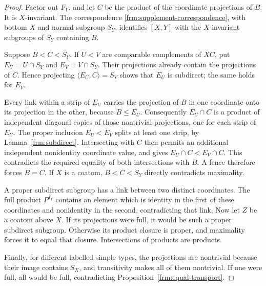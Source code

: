 \begin{proof}
Factor out $F_Y$, and let $C$ be the product of the coordinate
projections of $B$. It is $X$-invariant. The correspondence
\eqref{frm:supplement-correspondence}, with bottom $X$ and normal
subgroup $S_Y$, identifies $[X,Y]$ with the $X$-invariant subgroups of
$S_Y$ containing $B$.

Suppose $B<C<S_Y$. If $U<V$ are comparable complements of $XC$,
put $E_U=U\cap S_Y$ and $E_V=V\cap S_Y$. Their projections already
contain the projections of $C$. Hence projecting
$\langle E_U,C\rangle=S_Y$ shows that $E_U$ is subdirect; the same
holds for $E_V$.

Every link within a strip of $E_U$ carries the projection of $B$ in one
coordinate onto its projection in the other, because $B\le E_U$.
Consequently $E_U\cap C$ is a product of independent diagonal copies
of those nontrivial projections, one for each strip of $E_U$.
The proper inclusion $E_U<E_V$ splits at least one strip, by
Lemma~\ref{frm:subdirect}. Intersecting with $C$ then permits an
additional independent nonidentity coordinate value, and gives
$E_U\cap C<E_V\cap C$. This contradicts the required equality of
both intersections with $B$. A fence therefore forces $B=C$.
If $X$ is a coatom, $B<C<S_Y$ directly contradicts maximality.

A proper subdirect subgroup has a link between two distinct coordinates.
The full product $P^{I_Y}$ contains an element which is identity in the
first of these coordinates and nonidentity in the second, contradicting
that link. Now let $Z$ be a coatom above $X$. If its projections were
full, it would be such a proper subdirect subgroup. Otherwise its product
closure is proper, and maximality forces it to equal that closure.
Intersections of products are products.

Finally, for different labelled simple types, the projections are
nontrivial because their image contains $S_X$, and transitivity makes
all of them nontrivial. If one were full, all would be full, contradicting
Proposition~\ref{frm:equal-transport}.
\end{proof}

